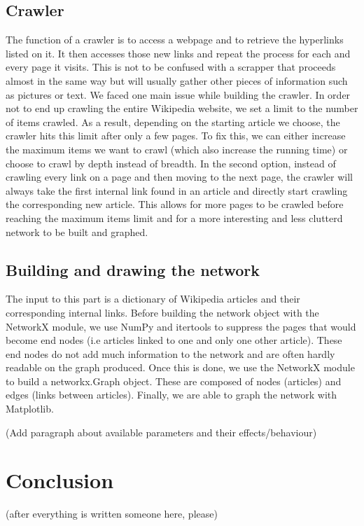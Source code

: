 \documentclass[10pt]{article}
\begin{document}
	\subsection{Crawler}
	The function of a crawler is to access a webpage and to retrieve the hyperlinks listed on it. It then accesses those new links and repeat the process for each and every page it visits. This is not to be confused with a scrapper that proceeds almost in the same way but will usually gather other pieces of information such as pictures or text.
We faced one main issue while building the crawler. In order not to end up crawling the entire Wikipedia website, we set a limit to the number of items crawled. As a result, depending on the starting article we choose, the crawler hits this limit after only a few pages. To fix this, we can either increase the maximum items we want to crawl (which also increase the running time) or choose to crawl by depth instead of breadth. In the second option, instead of crawling every link on a page and then moving to the next page, the crawler will always take the first internal link found in an article and directly start crawling the corresponding new article. This allows for more pages to be crawled before reaching the maximum items limit and for a more interesting and less clutterd network to be built and graphed.
	
	\subsection{Building and drawing the network}
	The input to this part is a dictionary of Wikipedia articles and their corresponding internal links. Before building the network object with the NetworkX module, we use NumPy and itertools to suppress the pages that would become end nodes (i.e articles linked to one and only one other article). These end nodes do not add much information to the network and are often hardly readable on the graph produced.
Once this is done, we use the NetworkX module to build a networkx.Graph object. These are composed of nodes (articles) and edges (links between articles). Finally, we are able to graph the network with Matplotlib.

(Add paragraph about available parameters and their effects/behaviour)
	
\section{Conclusion}

(after everything is written someone here, please)



\newpage
 

\end{document}
